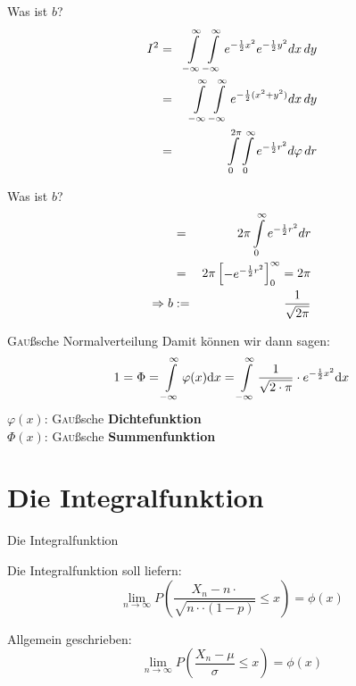 \documentclass[14pt]{beamer}
\begin{document}
\begin{frame}[allowframebreaks]{Was ist $b$?}
\small
\begin{eqnarray}
I^2 &=& \int\displaylimits^{\infty}_{-\infty} \int\displaylimits^{\infty}_{-\infty} e^{-\frac{1}{2}x^2} e^{-\frac{1}{2}y^2} dx \, dy \\
&=& \int\displaylimits^{\infty}_{-\infty} \int\displaylimits^{\infty}_{-\infty} e^{-\frac{1}{2}(x^2 + y^2)} dx \, dy \\ 
&=& \int\displaylimits^{2 \pi}_{0} \int\displaylimits^{\infty}_{0} e^{-\frac{1}{2}r^2} d\varphi \, dr
\end{eqnarray}
\end{frame}

\begin{frame}[allowframebreaks]{Was ist $b$?}
\small
\begin{eqnarray}
&=& 2 \pi \int\displaylimits^{\infty}_{0} e^{-\frac{1}{2}r^2} dr \\
&=& 2 \pi \begin{bmatrix}-e^{-\frac{1}{2} r^2} \end{bmatrix}^\infty_0 = 2 \pi\\
\Rightarrow b&:=&\frac{1}{\sqrt{2\pi}}
\end{eqnarray}
\end{frame}


\begin{frame}{\textrm{\textsc{Gau}ß}sche Normalverteilung}
Damit können wir dann sagen:
$$
1= \Phi =  \int\displaylimits^{\infty}_{-\infty} \varphi(x) {\mathrm d}x = \int\displaylimits^{\infty}_{-\infty} \frac{1}{\sqrt{2\cdot \pi}} \cdot e^{-\frac{1}{2}x^2} {\mathrm d}x
$$
$\varphi(x)$: \textrm{\textsc{Gau}ß}sche \textbf{Dichtefunktion}\\
$\Phi(x)$:  \textrm{\textsc{Gau}ß}sche \textbf{Summenfunktion}
\end{frame}

\section{Die Integralfunktion}
\begin{frame} {Die Integralfunktion}

Die Integralfunktion soll liefern:
$$ \lim_{n \rightarrow \infty} P\left(\frac{X_n-n\cdotp}{\sqrt{n\cdotp\cdot(1-p)}} \le x\right) = \phi(x) $$

Allgemein geschrieben:
$$ \lim_{n \rightarrow \infty} P\left(\frac{X_n-\mu}{\sigma} \le x\right) = \phi(x) $$

\end{frame}
\end{document}
